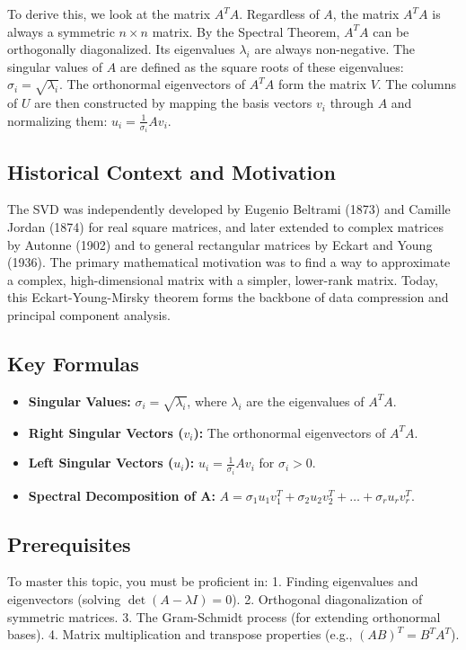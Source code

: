 \documentclass[11pt, letterpaper]{article}
\theoremstyle{definition}
\theoremstyle{remark}
\begin{document}
To derive this, we look at the matrix $A^TA$. Regardless of $A$, the matrix $A^TA$ is always a symmetric $n \times n$ matrix. By the Spectral Theorem, $A^TA$ can be orthogonally diagonalized. Its eigenvalues $\lambda_i$ are always non-negative. The singular values of $A$ are defined as the square roots of these eigenvalues: $\sigma_i = \sqrt{\lambda_i}$. The orthonormal eigenvectors of $A^TA$ form the matrix $V$. The columns of $U$ are then constructed by mapping the basis vectors $v_i$ through $A$ and normalizing them: $u_i = \frac{1}{\sigma_i}Av_i$.

\subsection{Historical Context and Motivation}
The SVD was independently developed by Eugenio Beltrami (1873) and Camille Jordan (1874) for real square matrices, and later extended to complex matrices by Autonne (1902) and to general rectangular matrices by Eckart and Young (1936). The primary mathematical motivation was to find a way to approximate a complex, high-dimensional matrix with a simpler, lower-rank matrix. Today, this Eckart-Young-Mirsky theorem forms the backbone of data compression and principal component analysis.

\subsection{Key Formulas}
\begin{itemize}
    \item \textbf{Singular Values:} $\sigma_i = \sqrt{\lambda_i}$, where $\lambda_i$ are the eigenvalues of $A^TA$.
    \item \textbf{Right Singular Vectors ($v_i$):} The orthonormal eigenvectors of $A^TA$.
    \item \textbf{Left Singular Vectors ($u_i$):} $u_i = \frac{1}{\sigma_i} A v_i$ for $\sigma_i > 0$.
    \item \textbf{Spectral Decomposition of A:} $A = \sigma_1 u_1 v_1^T + \sigma_2 u_2 v_2^T + \dots + \sigma_r u_r v_r^T$.
\end{itemize}

\subsection{Prerequisites}
To master this topic, you must be proficient in:
1. Finding eigenvalues and eigenvectors (solving $\det(A - \lambda I) = 0$).
2. Orthogonal diagonalization of symmetric matrices.
3. The Gram-Schmidt process (for extending orthonormal bases).
4. Matrix multiplication and transpose properties (e.g., $(AB)^T = B^T A^T$).
\end{document}
